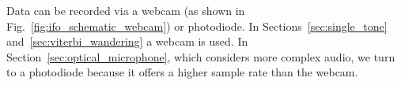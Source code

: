 \documentclass[paper-main.tex]{subfiles}
\begin{document}
Data can be recorded via a webcam (as shown in Fig.~\ref{fig:ifo_schematic_webcam}) or photodiode. 
In Sections~\ref{sec:single_tone} and~\ref{sec:viterbi_wandering} a webcam is used. 
In Section~\ref{sec:optical_microphone}, which considers more complex audio, we turn to a photodiode because it offers a higher sample rate than the webcam. 
\end{document}
